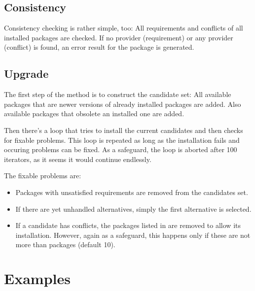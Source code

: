 \documentclass[10pt]{article}
\begin{document}

\subsection{Consistency}

Consistency checking is rather simple, too: All requirements and
conflicts of all installed packages are checked. If no provider
(requirement) or any provider (conflict) is found, an error result for
the package is generated.


\subsection{Upgrade}

The first step of the  method is to construct the
candidate set: All available packages that are newer versions of
already installed packages are added. Also available packages that
obsolete an installed one are added.

Then there's a loop that tries to install the current candidates and
then checks for fixable problems. This loop is repeated as long as the
installation fails and occuring problems can be fixed. As a safeguard,
the loop is aborted after 100 iterators, as it seems it would continue
endlessly.

The fixable problems are:
\begin{itemize}
\item
  Packages with unsatisfied requirements are removed from the
  candidates set.

\item
  If there are yet unhandled alternatives, simply the first
  alternative is selected.

\item
  If a candidate has conflicts, the packages listed in
   are removed to allow its
  installation. However, again as a safeguard, this happens only if
  these are not more than  packages (default 10).

\end{itemize}



\section{Examples}
\end{document}
